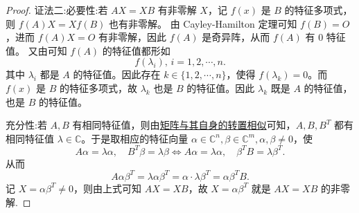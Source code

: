 \documentclass[../../main.tex]{subfiles}
\begin{document}
\begin{proof}
{\color{blue} 证法二:}{\heiti 必要性:}若 \( AX = XB \) 有非零解 \( X \)，记 \( f(x) \) 是 \( B \) 的特征多项式，则 \( f(A)X = Xf(B) \) 也有非零解。  
由 Cayley-Hamilton 定理可知 \( f(B) = O \)，进而 \( f(A)X = O \) 有非零解，因此 \( f(A) \) 是奇异阵，从而 \( f(A) \) 有 \( 0 \) 特征值。  
又由可知 \( f(A) \) 的特征值都形如  
\[ f(\lambda_i), \, i = 1,2,\cdots,n. \]  
其中 \( \lambda_i \) 都是 \( A \) 的特征值。因此存在 \( k \in \{1,2,\cdots,n\} \)，使得 \( f(\lambda_k) = 0 \)。而 \( f(x) \) 是 \( B \) 的特征多项式，故 \( \lambda_k \) 也是 \( B \) 的特征值。因此 \( \lambda_k \) 既是 \( A \) 的特征值，也是 \( B \) 的特征值。  

{\heiti 充分性:}若 \( A,B \) 有相同特征值，则由\hyperref[proposition:lambda-矩阵一定与其转置相似]{矩阵与其自身的转置相似}可知，\( A,B,B^T \) 都有相同特征值 \( \lambda \in \mathbb{C} \)。于是取相应的特征向量 \( \alpha \in \mathbb{C}^n, \beta \in \mathbb{C}^m, \alpha,\beta \ne 0 \)，使  
\[ A\alpha = \lambda \alpha, \quad B^T\beta = \lambda \beta \Longleftrightarrow A\alpha = \lambda \alpha, \quad \beta^TB = \lambda \beta^T. \]  
从而  
\[ A\alpha\beta^T = \lambda \alpha\beta^T = \alpha \cdot \lambda \beta^T = \alpha\beta^TB. \]  
记 \( X = \alpha\beta^T \ne 0 \)，则由上式可知 \( AX = XB \)，故 \( X = \alpha\beta^T \) 就是 \( AX = XB \) 的非零解. 
\end{proof}
\end{document}
